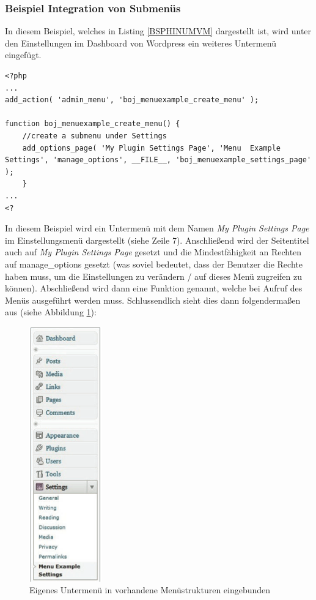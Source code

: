\subsubsection{Beispiel Integration von Submenüs}
In diesem Beispiel, welches in Listing \ref{BSPHINUMVM} dargestellt ist, wird unter den Einstellungen im Dashboard von Wordpress ein weiteres Untermenü eingefügt.
\begin{lstlisting}
<?php
...
add_action( 'admin_menu', 'boj_menuexample_create_menu' );

function boj_menuexample_create_menu() {
	//create a submenu under Settings
	add_options_page( 'My Plugin Settings Page', 'Menu 	Example Settings', 'manage_options', __FILE__, 'boj_menuexample_settings_page' );
	}
...
<?
\end{lstlisting}
In diesem Beispiel wird ein Untermenü mit dem Namen \emph{My Plugin Settings Page} im Einstellungsmenü dargestellt (siehe Zeile 7). Anschließend wird der Seitentitel auch auf \emph{My Plugin Settings Page} gesetzt und die Mindestfähigkeit an Rechten auf manage\_options gesetzt (was soviel bedeutet, dass der Benutzer die Rechte haben muss, um die Einstellungen zu verändern / auf dieses Menü zugreifen zu können). Abschließend wird dann eine Funktion genannt, welche bei Aufruf des Menüs ausgeführt werden muss.\newline
Schlussendlich sieht dies dann folgendermaßen aus (siehe Abbildung \ref{img:untermenuinvorhmenu}):
  \begin{figure}[htbp]
	\begin{center}
		\includegraphics[angle={360}, scale=0.61]{pictures/untermenuinvorhmenu.png}
	    \caption{Eigenes Untermenü in vorhandene Menüstrukturen eingebunden}
	    \label{img:untermenuinvorhmenu}
	    	\end{center}
   \end{figure} \newline
